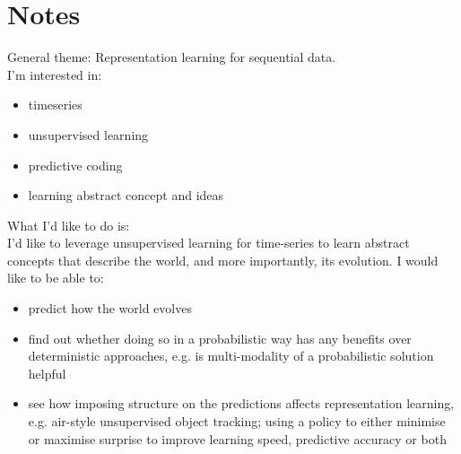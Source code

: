 \section{Notes}

General theme: Representation learning for sequential data.\\

I'm interested in:
\begin{itemize}
	\item timeseries
	\item unsupervised learning
	\item predictive coding
	\item learning abstract concept and ideas
\end{itemize}

What I'd like to do is:\\
I'd like to leverage unsupervised learning for time-series to learn abstract concepts that describe the world, and more importantly, its evolution. I would like to be able to:\\
\begin{itemize}
	\item predict how the world evolves
	\item find out whether doing so in a probabilistic way has any benefits over deterministic approaches, e.g. is multi-modality of a probabilistic solution helpful
	\item see how imposing structure on the predictions affects representation learning, e.g. air-style unsupervised object tracking; using a policy to either minimise or maximise surprise to improve learning speed, predictive accuracy or both
\end{itemize}
